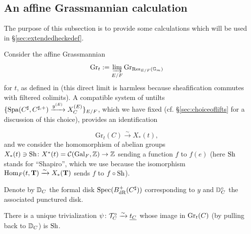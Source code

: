 \subsection{An affine Grassmannian calculation}\label{sec:affGrasscalc}
The purpose of this subsection is to provide some calculations which will be used in \S \ref{sec:extendedheckedef}.

Consider the affine Grassmannian 
\begin{equation*}
\mathrm{Gr}_{t} := \varinjlim_{E/F} \textnormal{Gr}_{\textnormal{Res}_{E/F}(\mathbb{G}_{m})}
\end{equation*}
for $t$, as defined in \cite[\S 19]{SW20} (this direct limit is harmless because sheafification commutes with filtered colimits). A compatible system of untilts $\{\mathrm{Spa}(C^{\sharp},C^{\sharp,+}) \xrightarrow{{y^{(E)}}} X_{C}^{(E)}\}_{E/F}$, which we have fixed (cf. \S \ref{sec:choiceoflifts} for a discussion of this choice), provides an identification


\begin{equation*}
    \mathrm{Gr}_{t}(C) \xrightarrow{\sim} X_{*}(t),
\end{equation*}
and we consider the homomorphism of abelian groups $X_{*}(t) \ni \textnormal{Sh}\colon X^{*}(t) = \mathcal{C}(\mathrm{Gal}_{F},\mathbb{Z}) \to \mathbb{Z}$ sending a function $f$ to $f(e)$ (here $\textnormal{Sh}$ stands for ``Shapiro'', which we use because the isomorphism $\mathrm{Hom}_{F}(t,\mathbf{T}) \xrightarrow{\sim} X_{*}(\mathbf{T})$ sends $f$ to $f \circ \textnormal{Sh}$). 

Denote by $\mathbb D_{C}$ the formal disk $\mathrm{Spec}(B_{\textnormal{dR}}^{+}(C^{\sharp}))$ corresponding to $y$ and $\mathbb D_{C}^{\circ}$ the associated punctured disk. 

\begin{lem}\label{lem:Grt} There is a unique trivialization $\psi \colon \mathcal{T}_{C}^{\circ} \xrightarrow{\sim} \underline{t_{C}}$ whose image in $\textnormal{Gr}_{t}(C)$ (by pulling back to $\mathbb D_{C}$) is $\textnormal{Sh}$. 
\end{lem}

